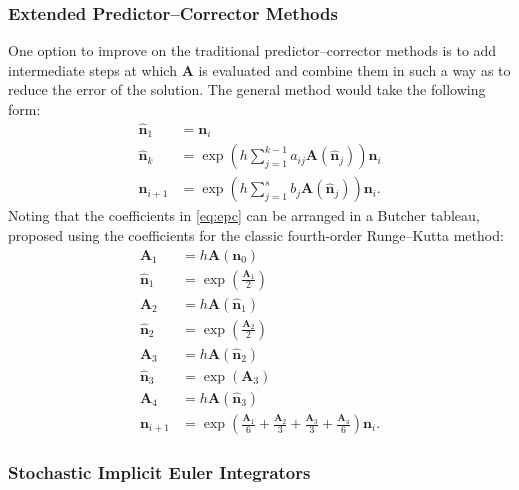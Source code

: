 \documentclass[3p,authoryear]{elsarticle}
\newcommand{\vect}[1]{\mathbf{#1}} %
\begin{document}
\subsubsection{Extended Predictor--Corrector Methods}

One option to improve on the traditional predictor--corrector methods is to add
intermediate steps at which $\vect{A}$ is evaluated and combine them in such a
way as to reduce the error of the solution. The general method would take the
following form:
\begin{equation}
  \label{eq:epc}
  \begin{split}
    \hat{\vect{n}}_1 &= \vect{n}_i \\
    \hat{\vect{n}}_k &= \exp \left( h \sum_{j=1}^{k-1} a_{ij} \vect{A}(\hat{\vect{n}}_j) \right) \vect{n}_i \\
    \vect{n}_{i+1} &= \exp \left( h \sum_{j=1}^{s} b_{j} \vect{A}(\hat{\vect{n}}_j) \right) \vect{n}_i .
  \end{split}
\end{equation}
Noting that the coefficients in \cref{eq:epc} can be arranged in a Butcher
tableau, \citet{josey2016jcp} proposed using the coefficients for the classic
fourth-order Runge--Kutta method:
\begin{equation}
  \begin{split}
    \vect{A}_1 &= h\vect{A}(\vect{n}_0) \\
    \hat{\vect{n}}_1 &= \exp \left ( \frac{\vect{A}_1}{2} \right ) \\
    \vect{A}_2 &= h\vect{A}(\hat{\vect{n}}_1) \\
    \hat{\vect{n}}_2 &= \exp \left ( \frac{\vect{A}_2}{2} \right ) \\
    \vect{A}_3 &= h \vect{A}(\hat{\vect{n}}_2) \\
    \hat{\vect{n}}_3 &= \exp \left ( \vect{A}_3 \right ) \\
    \vect{A}_4 &= h\vect{A}(\hat{\vect{n}}_3) \\
    \vect{n}_{i+1} &= \exp \left ( \frac{\vect{A}_1}{6} + \frac{\vect{A}_2}{3}
      + \frac{\vect{A}_3}{3} + \frac{\vect{A}_4}{6} \right ) \vect{n}_i.
  \end{split}
\end{equation}

\subsubsection{Stochastic Implicit Euler Integrators}
\end{document}
